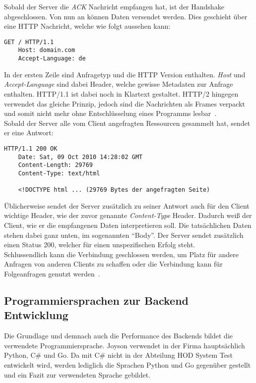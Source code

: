 Sobald der Server die \textit{ACK} Nachricht empfangen hat, ist der Handshake
abgeschlossen. Von nun an können Daten versendet werden. Dies geschieht über
eine HTTP Nachricht, welche wie folgt aussehen kann:\\

\begin{lstlisting}[caption=Beispielhafte HTTP Anfrage]
    GET / HTTP/1.1
    Host: domain.com
    Accept-Language: de
\end{lstlisting}

In der ersten Zeile sind Anfragetyp und die HTTP Version enthalten. \textit{Host}
und \textit{Accept-Language} sind dabei Header, welche gewisse Metadaten zur 
Anfrage enthalten. HTTP/1.1 ist dabei noch in Klartext gestaltet. HTTP/2 hingegen 
verwendet das gleiche Prinzip, jedoch sind die Nachrichten als Frames verpackt 
und somit nicht mehr ohne Entschlüsselung eines Programms lesbar~\cite{Moz21}.\\

Sobald der Server alle vom Client angefragten Ressourcen gesammelt hat, 
sendet er eine Antwort:\\

\begin{lstlisting}[caption=Beispielhafte HTTP Antwort]
    HTTP/1.1 200 OK
    Date: Sat, 09 Oct 2010 14:28:02 GMT
    Content-Length: 29769
    Content-Type: text/html
    
    <!DOCTYPE html ... (29769 Bytes der angefragten Seite)
\end{lstlisting}

Üblicherweise sendet der Server zusätzlich zu seiner Antwort auch für den Client wichtige Header,
wie der zuvor genannte \textit{Content-Type} Header. Dadurch weiß der Client,
wie er die empfangenen Daten interpretieren soll. Die tatsächlichen Daten stehen
dabei ganz unten, im sogenannten ``Body''. Der Server sendet zusätzlich einen 
Status 200, welcher für einen unspezifischen Erfolg steht. \\

Schlussendlich kann die Verbindung geschlossen werden, um Platz für andere Anfragen
von anderen Clients zu schaffen oder die Verbindung kann für Folgeanfragen genutzt
werden~\cite{http02}.

\newpage

\subsection{Programmiersprachen zur Backend Entwicklung}
Die Grundlage und demnach auch die Performance des Backends bildet die 
verwendete Programmiersprache. Joyson verwendet in der Firma hauptsächlich 
Python, C\# und Go. Da mit C\# nicht in der Abteilung 
\gls{HOD} System Test entwickelt wird, werden lediglich die 
Sprachen Python und Go gegenüber gestellt und ein Fazit zur verwendeten Sprache 
gebildet. \\

